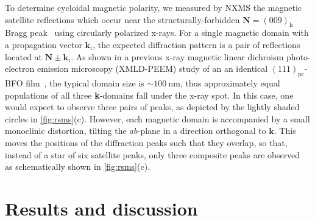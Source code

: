 \documentclass[aps,prb,twocolumn,showpacs,superscriptaddress, longbibliography, 10pt]{revtex4-1}
\begin{document}
{To determine cycloidal magnetic polarity, we measured by NXMS the magnetic satellite reflections which occur near the structurally-forbidden $\mathbf{N}=(009)_\mathrm{h}$ Bragg peak~\cite{waterfieldprice2016coherent} using circularly polarized x-rays. For a single magnetic domain with a propagation vector $\mathbf{k}_i$, the expected diffraction pattern is a pair of reflections located at $\mathbf{N} \pm \mathbf{k}_i$. As shown in a previous x-ray magnetic linear dichroism photo-electron emission microscopy (XMLD-PEEM) study of an an identical $(111)_\mathrm{pc}$-BFO film~\cite{waterfieldprice2016coherent}, the typical domain size is $\sim\SI{100}{\nano\metre}$, thus approximately equal populations of all three \textbf{k}-domains fall under the x-ray spot. In this case, one would expect to observe three pairs of peaks, as depicted by the lightly shaded circles in \cref{fig:rsms}(c). However, each magnetic domain is accompanied by a small monoclinic distortion, tilting the $ab$-plane in a direction orthogonal to $\mathbf{k}$. This moves the positions of the diffraction peaks such that they overlap, so that, instead of a star of six satellite peaks, only three composite peaks are observed~\cite{waterfieldprice2016coherent} as schematically shown in \cref{fig:rsms}(c).

\section{Results and discussion}

}
\end{document}
